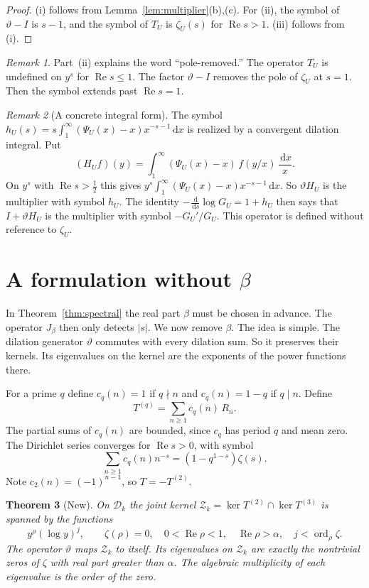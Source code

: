 \documentclass[12pt,letterpaper]{article}
\newtheorem{theorem}{Theorem}[section]
\theoremstyle{definition}
\theoremstyle{remark}
\newtheorem{remark}[theorem]{Remark}
\newcommand{\Ree}{\operatorname{Re}}
\newcommand{\dd}{\,\mathrm{d}}
\newcommand{\Dk}{\mathcal{D}_k}
\newcommand{\kerop}{\operatorname{ker}}
\newcommand{\ord}{\operatorname{ord}}
\newcommand{\yD}{\vartheta}
\begin{document}
\begin{proof}
(i) follows from Lemma~\ref{lem:multiplier}(b),(c). For (ii), the symbol
of $\yD-I$ is $s-1$, and the symbol of $T_U$ is $\zeta_U(s)$ for
$\Ree s>1$. (iii) follows from (i).
\end{proof}

\begin{remark}
Part~(ii) explains the word ``pole-removed.'' The operator $T_U$ is
undefined on $y^s$ for $\Ree s\le1$. The factor $\yD-I$ removes the pole of
$\zeta_U$ at $s=1$. Then the symbol extends past $\Ree s=1$.
\end{remark}

\begin{remark}[A concrete integral form]
The symbol $h_U(s)=s\int_1^\infty(\Psi_U(x)-x)x^{-s-1}\dd x$ is realized by
a convergent dilation integral. Put
\[
(H_Uf)(y)=\int_1^\infty(\Psi_U(x)-x)\,f(y/x)\,\frac{\dd x}{x}.
\]
On $y^s$ with $\Ree s>\frac12$ this gives
$y^s\int_1^\infty(\Psi_U(x)-x)x^{-s-1}\dd x$. So $\yD H_U$ is the
multiplier with symbol $h_U$. The identity
$-\frac{\dd}{\dd s}\log G_U=1+h_U$ then says that $I+\yD H_U$ is the
multiplier with symbol $-G_U'/G_U$. This operator is defined without
reference to $\zeta_U$.
\end{remark}

\section{A formulation without \texorpdfstring{$\beta$}{beta}}\label{sec:betafree}

In Theorem~\ref{thm:spectral} the real part $\beta$ must be chosen in
advance. The operator $J_\beta$ then only detects $|s|$. We now remove
$\beta$. The idea is simple. The dilation generator $\yD$ commutes with
every dilation sum. So it preserves their kernels. Its eigenvalues on the
kernel are the exponents of the power functions there.

For a prime $q$ define $c_q(n)=1$ if $q\nmid n$ and $c_q(n)=1-q$ if
$q\mid n$. Define
\[
T^{(q)}=\sum_{n\ge1}c_q(n)\,R_n.
\]
The partial sums of $c_q(n)$ are bounded, since $c_q$ has period $q$ and
mean zero. The Dirichlet series converges for $\Ree s>0$, with symbol
\begin{equation}\label{eq:residue-symbol}
 \sum_{n\ge1}c_q(n)n^{-s}=(1-q^{1-s})\zeta(s).
\end{equation}
Note $c_2(n)=(-1)^{n-1}$, so
$T=-T^{(2)}$.

\begin{theorem}[New]\label{thm:betafree}
On $\Dk$ the joint kernel $\mathcal Z_k=\kerop T^{(2)}\cap\kerop T^{(3)}$
is spanned by the functions
\[
y^\rho(\log y)^j,\qquad \zeta(\rho)=0,\quad 0<\Ree\rho<1,\quad
\Ree\rho>\alpha,\quad j<\ord_\rho\zeta.
\]
The operator $\yD$ maps $\mathcal Z_k$ to itself. Its eigenvalues on
$\mathcal Z_k$ are exactly the nontrivial zeros of $\zeta$ with real part
greater than $\alpha$. The algebraic multiplicity of each eigenvalue is
the order of the zero.
\end{theorem}
\end{document}
